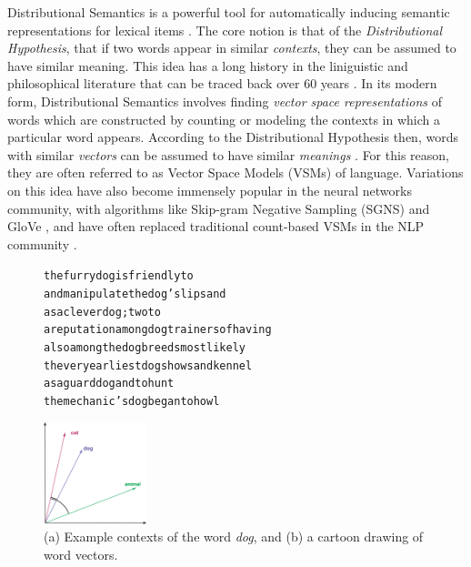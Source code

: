 \documentclass[12pt]{article}
\begin{document}
Distributional Semantics is a powerful tool for automatically inducing semantic
representations for lexical items \cite{turney:2010:jair,erk:2012:llc}.  The
core notion is that of the {\em Distributional Hypothesis}, that if two words
appear in similar {\em contexts}, they can be assumed to have similar meaning.
This idea has a long history in the liniguistic and philosophical literature that
can be traced back over 60 years
\cite{wittgenstein:1953:pi,harris:1954:word,firth:1957:la}. In its modern form,
Distributional Semantics involves finding {\em vector space representations} of
words which are constructed by counting or modeling the contexts in which a
particular word appears. According to the Distributional Hypothesis then, words
with similar {\em vectors} can be assumed to have similar {\em meanings}
\cite{turney:2010:jair}. For this reason, they are often referred to as
Vector Space Models (VSMs) of language. Variations on this idea have also
become immensely popular in the neural networks community, with algorithms
like Skip-gram Negative Sampling (SGNS) \cite{mikolov:2013:iclr} and GloVe
\cite{pennington:2014:emnlp}, and have often replaced traditional count-based
VSMs in the NLP community \cite{baroni:2014:acl}.

\begin{figure}
\centering
\begin{minipage}{7cm}
\begin{scriptsize}
\begin{alltt}
         the furry {dog} is friendly to
and manipulate the {dog} 's lips and
       as a clever {dog} ; two to
a reputation among {dog} trainers of having
    also among the {dog} breeds most likely
 the very earliest {dog} shows and kennel
        as a guard {dog} and to hunt
   the mechanic 's {dog} began to howl
\end{alltt}
\end{scriptsize}
\end{minipage}\qquad
\begin{minipage}{3cm}
\includegraphics[width=3cm]{figures/vsm}
\end{minipage}
\caption{(a) Example contexts of the word {\em dog}, and (b) a cartoon drawing
of word vectors.}
\label{fig:vsm}
\end{figure}
\end{document}
